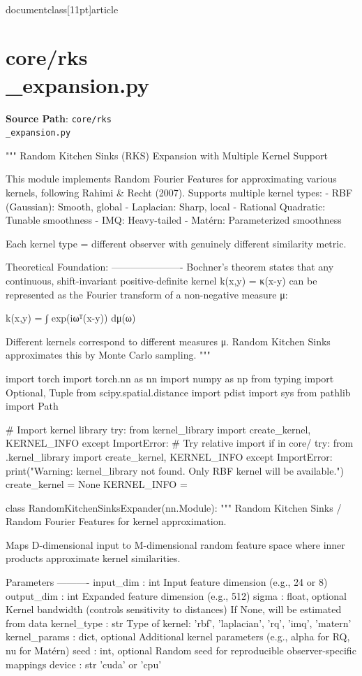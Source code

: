 \\documentclass[11pt]{article}
\begin{document}
\section*{core/rks\\_expansion.py}
\textbf{Source Path}: \texttt{core/rks\\_expansion.py}\par
\bigskip
\begin{CodeBlock}
"""
Random Kitchen Sinks (RKS) Expansion with Multiple Kernel Support

This module implements Random Fourier Features for approximating various kernels,
following Rahimi & Recht (2007). Supports multiple kernel types:
- RBF (Gaussian): Smooth, global
- Laplacian: Sharp, local
- Rational Quadratic: Tunable smoothness
- IMQ: Heavy-tailed
- Matérn: Parameterized smoothness

Each kernel type = different observer with genuinely different similarity metric.

Theoretical Foundation:
----------------------
Bochner's theorem states that any continuous, shift-invariant positive-definite
kernel k(x,y) = κ(x-y) can be represented as the Fourier transform of a
non-negative measure μ:

    k(x,y) = ∫ exp(iωᵀ(x-y)) dμ(ω)

Different kernels correspond to different measures μ.
Random Kitchen Sinks approximates this by Monte Carlo sampling.
"""

import torch
import torch.nn as nn
import numpy as np
from typing import Optional, Tuple
from scipy.spatial.distance import pdist
import sys
from pathlib import Path

# Import kernel library
try:
    from kernel_library import create_kernel, KERNEL_INFO
except ImportError:
    # Try relative import if in core/
    try:
        from .kernel_library import create_kernel, KERNEL_INFO
    except ImportError:
        print("Warning: kernel_library not found. Only RBF kernel will be available.")
        create_kernel = None
        KERNEL_INFO = {}


class RandomKitchenSinksExpander(nn.Module):
    """
    Random Kitchen Sinks / Random Fourier Features for kernel approximation.
    
    Maps D-dimensional input to M-dimensional random feature space where
    inner products approximate kernel similarities.
    
    Parameters
    ----------
    input_dim : int
        Input feature dimension (e.g., 24 or 8)
    output_dim : int
        Expanded feature dimension (e.g., 512)
    sigma : float, optional
        Kernel bandwidth (controls sensitivity to distances)
        If None, will be estimated from data
    kernel_type : str
        Type of kernel: 'rbf', 'laplacian', 'rq', 'imq', 'matern'
    kernel_params : dict, optional
        Additional kernel parameters (e.g., alpha for RQ, nu for Matérn)
    seed : int, optional
        Random seed for reproducible observer-specific mappings
    device : str
        'cuda' or 'cpu'
    

\end{CodeBlock}
\end{document}
